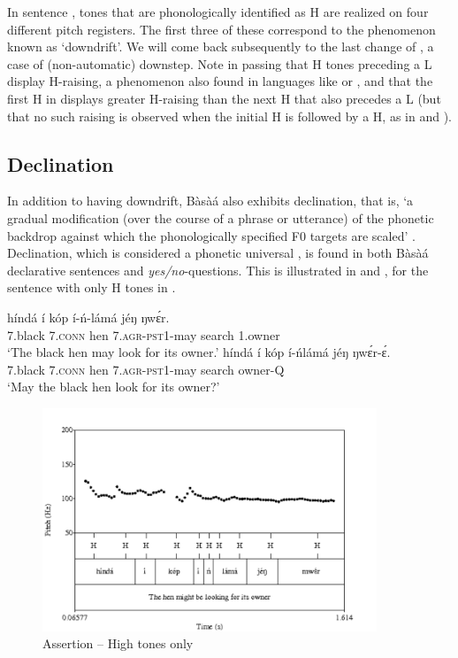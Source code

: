 \documentclass[output=paper,newtxmath,modfonts,nonflat,hidelinks]{langsci/langscibook}
\begin{document}
\newpage 
\noindent In sentence , tones that are phonologically identified as H are realized on four different pitch registers. The first three of these correspond to the phenomenon known as `downdrift'. We will come back subsequently to the last change of , a case of (non-automatic) downstep. Note in passing that H tones preceding a L  display H-raising, a phenomenon also found in languages like  \citep[a.o.][]{ConnellLadd90, Laniran92, LaniranClements03} or  \citep{RiallandSome00, Rialland01}, and that the first H in  displays greater H-raising than the next H that also precedes a L (but that no such raising is observed when the initial H is followed by a H, as in  and ).  


\subsection{Declination}

In addition to having downdrift, Bàsà{á} also exhibits declination, that is, `a gradual modification (over the course of a phrase or utterance) of the phonetic backdrop against which the phonologically specified F$0$ targets are scaled' \citep{ConnellLadd90, Connell11}. Declination, which is considered a phonetic universal \citep{Ladd84, Connell11}, is found in both Bàsà{á} declarative sentences and \emph{yes/no}-questions. This is illustrated in  and , for the sentence with only H tones in  \citep{MakassoEtAl17}.


\ea \label{ex:HamlaouiMakasso:2} 
\ea \gll hínd{á} í kóp í-ń-l{á}m{á} j\'eŋ ŋw\'ɛr.\\
7.black 7.\textsc{conn} hen 7.\textsc{agr}-\textsc{pst}1-may search 1.owner\\
\glt `The black hen may look for its owner.'\label{ex:HamlaouiMakasso:2a} 
\ex \gll hínd{á} í kóp í-ńl{á}m{á} j\'eŋ ŋw\'ɛr-\'ɛ.\\
7.black 7.\textsc{conn} hen 7.\textsc{agr}-\textsc{pst}1-may search owner-Q\\
\glt `May the black hen look for its owner?'\label{ex:HamlaouiMakasso:2b} 
\z
\z


\begin{figure}
\centering
 \includegraphics[width=10cm]{figures/HenManNov}  
\caption{Assertion -- High tones only \citep{MakassoEtAl17} \label{fig:HamlaouiMakasso:3}}
\end{figure}
\end{document}
